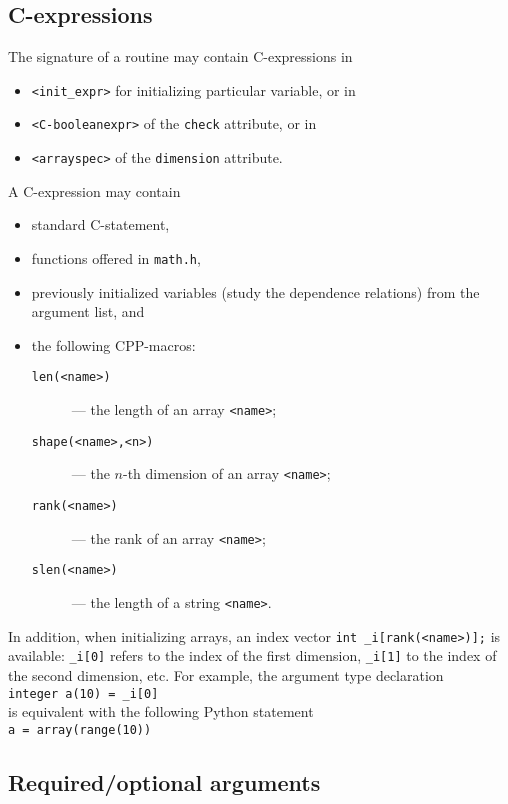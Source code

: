 \subsection{C-expressions}
\label{sec:C-expr}

The signature of a routine may contain C-expressions in
\begin{itemize}
\item \texttt{<init\_expr>} for initializing particular variable, or in
\item \texttt{<C-booleanexpr>} of the \texttt{check} attribute, or in
\item \texttt{<arrayspec>} of the \texttt{dimension} attribute.
\end{itemize}
A C-expression may contain
\begin{itemize}
\item standard C-statement,
\item functions offered in \texttt{math.h},
\item previously initialized variables (study
the dependence relations) from the argument list, and
\item the following CPP-macros:
  \begin{description}
  \item[\texttt{len(<name>)}] --- the length of an array \texttt{<name>};
  \item[\texttt{shape(<name>,<n>)}] --- the $n$-th dimension of an array
    \texttt{<name>};
  \item[\texttt{rank(<name>)}] --- the rank of an array \texttt{<name>};
  \item[\texttt{slen(<name>)}] --- the length of a string \texttt{<name>}.
  \end{description}
\end{itemize}


In addition, when initializing arrays, an index vector \texttt{int
  \_i[rank(<name>)];}
is available: \texttt{\_i[0]} refers to
the index of the first dimension, \texttt{\_i[1]} to the index of
the second dimension, etc. For example, the argument type declaration\\
\hspace*{2em}\texttt{integer a(10) = \_i[0]}\\
is equivalent with the following Python statement\\
\hspace*{2em}\texttt{a = array(range(10))}


\subsection{Required/optional arguments}
\label{sec:reqoptargs}

